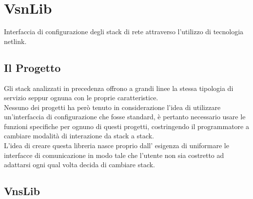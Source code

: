 

\chapter{VsnLib}                %
\lhead[\fancyplain{}{\bfseries\thepage}]{\fancyplain{}{\bfseries\rightmark}}
Interfaccia di configurazione degli stack di rete attraverso l'utilizzo di tecnologia netlink.
\section{Il Progetto}                 %
Gli stack analizzati in precedenza offrono a grandi linee la stessa tipologia di servizio seppur ognuna con le proprie caratteristice.\\
Nessuno dei progetti ha per\`o tenuto in considerazione l'idea di utilizzare un'interfaccia di configurazione che fosse standard, \`e pertanto necessario usare le funzioni specifiche per ognuno di questi progetti, costringendo il programmatore a cambiare modalit\`a di interazione da stack a stack.\\
L'idea di creare questa libreria nasce proprio dall' esigenza di uniformare le interfacce di comunicazione in modo tale che l'utente non sia costretto ad adattarsi ogni qual volta decida di cambiare stack.\\
\section{VnsLib}
